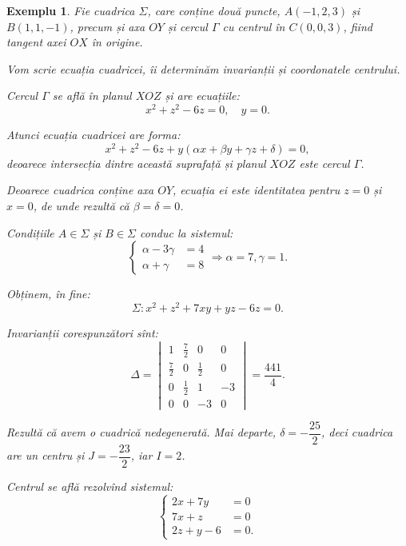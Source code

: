 \documentclass[11pt,a4paper]{article}
\theoremstyle{dotless}
\theoremstyle{dotlessdr}
\newtheorem{example}{Exemplu}[section]
\begin{document}
\begin{example}
	Fie cuadrica $\Sigma$, care conține două puncte, $A(-1, 2, 3)$ și
$B(1, 1, -1)$, precum și axa $OY$ și cercul $\Gamma$ cu centrul în 
$C(0, 0, 3)$, fiind tangent axei $OX$ în origine.

Vom scrie ecuația cuadricei, îi determinăm invarianții și coordonatele 
centrului.

Cercul $\Gamma$ se află în planul $XOZ$ și are ecuațiile: 
 \[
	x^2 + z^2 - 6z = 0, \quad y = 0.
\]

Atunci ecuația cuadricei are forma: 
 \[
	x^2 + z^2 - 6z + y(\alpha x + \beta y + \gamma z + \delta) = 0,
\]
deoarece intersecția dintre această suprafață și planul $XOZ$ este cercul
$\Gamma$.

Deoarece cuadrica conține axa $OY$, ecuația ei este identitatea pentru $z = 0$
și $x = 0$, de unde rezultă că $\beta = \delta = 0$.

Condițiile $A \in \Sigma$ și $B \in \Sigma$ conduc la sistemul: 
 \[
	\begin{cases}	
	    \alpha - 3 \gamma &= 4 \\
	    \alpha + \gamma &= 8
    \end{cases} \Longrightarrow \alpha = 7, \gamma = 1.
\]

Obținem, în fine: 
 \[
	\Sigma : x^2 + z^2 + 7xy + yz - 6z = 0.
\]

Invarianții corespunzători sînt: 
 \[
	\Delta = \begin{vmatrix}
	             1 & \frac{7}{2} & 0 & 0 \\
	             \frac{7}{2} & 0 & \frac{1}{2} & 0 \\
	             0 & \frac{1}{2} & 1 & -3 \\
	             0 & 0 & -3 & 0
             \end{vmatrix} = \dfrac{441}{4}.
\]

Rezultă că avem o cuadrică nedegenerată. Mai departe, $\delta = -\dfrac{25}{2}$,
deci cuadrica are un centru și $J = - \dfrac{23}{2}$, iar $I = 2$.

Centrul se află rezolvînd sistemul: 
 \[
	\begin{cases}	
	    2x + 7y &= 0 \\
	    7x + z &= 0 \\
	    2z + y - 6 &= 0.
    \end{cases}
\]
\end{example}

\end{document}
